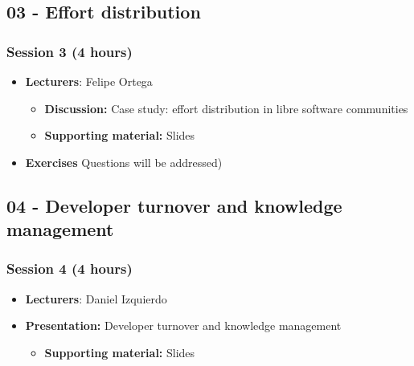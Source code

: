\documentclass[a4paper]{article}
\begin{document}
\subsection{03 - Effort distribution}

\subsubsection{Session 3 (4 hours)}


\begin{itemize}
\item \textbf{Lecturers}: Felipe Ortega
  \begin{itemize}
  \item \textbf{Discussion:} Case study: effort distribution in libre software communities
  \item \textbf{Supporting material:} Slides
  \end{itemize}
\item \textbf{Exercises} Questions will be addressed)

\end{itemize}



\subsection{04 - Developer turnover and knowledge management}

\subsubsection{Session 4 (4 hours)}

\begin{itemize}
\item \textbf{Lecturers}: Daniel Izquierdo
\item \textbf{Presentation:} Developer turnover and knowledge management
  \begin{itemize}
  \item \textbf{Supporting material:} Slides
  \end{itemize}
\end{itemize}
  
\end{document}
